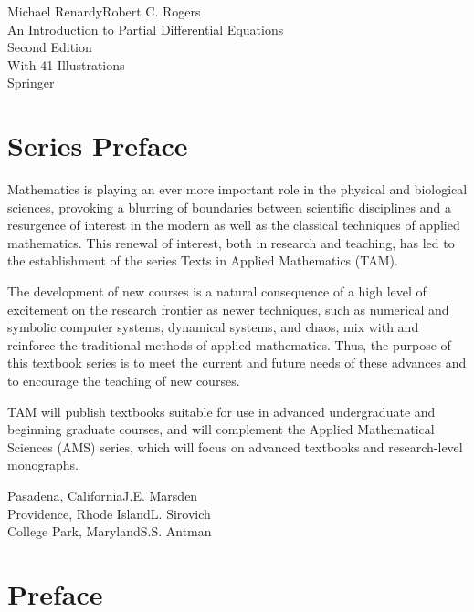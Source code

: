 \begin{center}Michael Renardy\quad Robert C. Rogers\\An Introduction to Partial Differential Equations\\Second Edition\\With 41 Illustrations\\Springer\end{center}

\clearpage\section*{Series Preface}\label{sec:series-preface}

Mathematics is playing an ever more important role in the physical and biological sciences, provoking a blurring of boundaries between scientific disciplines and a resurgence of interest in the modern as well as the classical techniques of applied mathematics. This renewal of interest, both in research and teaching, has led to the establishment of the series Texts in Applied Mathematics (TAM).

The development of new courses is a natural consequence of a high level of excitement on the research frontier as newer techniques, such as numerical and symbolic computer systems, dynamical systems, and chaos, mix with and reinforce the traditional methods of applied mathematics. Thus, the purpose of this textbook series is to meet the current and future needs of these advances and to encourage the teaching of new courses.

TAM will publish textbooks suitable for use in advanced undergraduate and beginning graduate courses, and will complement the Applied Mathematical Sciences (AMS) series, which will focus on advanced textbooks and research-level monographs.

\begin{flushright}Pasadena, California\hfill J.E. Marsden\\Providence, Rhode Island\hfill L. Sirovich\\College Park, Maryland\hfill S.S. Antman\end{flushright}

\clearpage\section*{Preface}\label{sec:author-preface}

